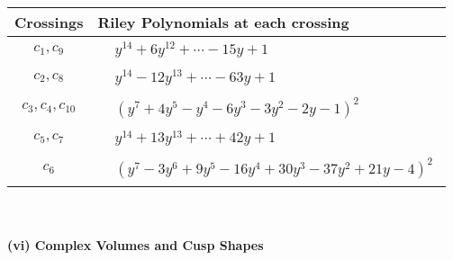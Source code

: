 \documentclass[1p]{elsarticle_modified}
\theoremstyle{definition}
\begin{document}
\begin{tabular}{m{50pt}|m{274pt}}
Crossings & \hspace{64pt}Riley Polynomials at each crossing \\
\hline $$\begin{aligned}c_{1},c_{9}\end{aligned}$$&$\begin{aligned}
&y^{14}+6 y^{12}+\cdots-15 y+1
\end{aligned}$\\
\hline $$\begin{aligned}c_{2},c_{8}\end{aligned}$$&$\begin{aligned}
&y^{14}-12 y^{13}+\cdots-63 y+1
\end{aligned}$\\
\hline $$\begin{aligned}c_{3},c_{4},c_{10}\end{aligned}$$&$\begin{aligned}
&(y^7+4 y^5- y^4-6 y^3-3 y^2-2 y-1)^2
\end{aligned}$\\
\hline $$\begin{aligned}c_{5},c_{7}\end{aligned}$$&$\begin{aligned}
&y^{14}+13 y^{13}+\cdots+42 y+1
\end{aligned}$\\
\hline $$\begin{aligned}c_{6}\end{aligned}$$&$\begin{aligned}
&(y^7-3 y^6+9 y^5-16 y^4+30 y^3-37 y^2+21 y-4)^2
\end{aligned}$\\
\hline
\end{tabular}\\~\\
\newpage\flushleft \textbf{(vi) Complex Volumes and Cusp Shapes}
\end{document}
